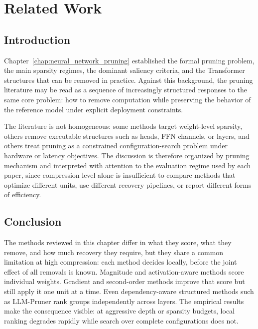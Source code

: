 \chapter{Related Work}
\label{chap:related_work_pruning}

\section{Introduction}

Chapter~\ref{chap:neural_network_pruning} established the formal pruning problem, the main sparsity
regimes, the dominant saliency criteria, and the Transformer structures that
can be removed in practice. Against this background, the pruning literature
may be read as a sequence of increasingly structured responses to the same
core problem: how to remove computation while preserving the behavior of the
reference model under explicit deployment constraints.

The literature is not homogeneous: some methods target weight-level sparsity,
others remove executable structures such as heads, FFN channels, or layers,
and others treat pruning as a constrained configuration-search problem under
hardware or latency objectives. The discussion is therefore organized by
pruning mechanism and interpreted with attention to the evaluation regime used
by each paper, since compression level alone is insufficient to compare methods
that optimize different units, use different recovery pipelines, or report
different forms of efficiency.


\begingroup
\def\RenderPruningReviewDiscussion{}

\endgroup

\section{Conclusion}

The methods reviewed in this chapter differ in what they score, what they remove, and how much recovery they require, but they share a common limitation at high compression: each method decides locally, before the joint effect of all removals is known. Magnitude and activation-aware methods score individual weights. Gradient and second-order methods improve that score but still apply it one unit at a time. Even dependency-aware structured methods such as LLM-Pruner rank groups independently across layers. The empirical results make the consequence visible: at aggressive depth or sparsity budgets, local ranking degrades rapidly while search over complete configurations does not.
